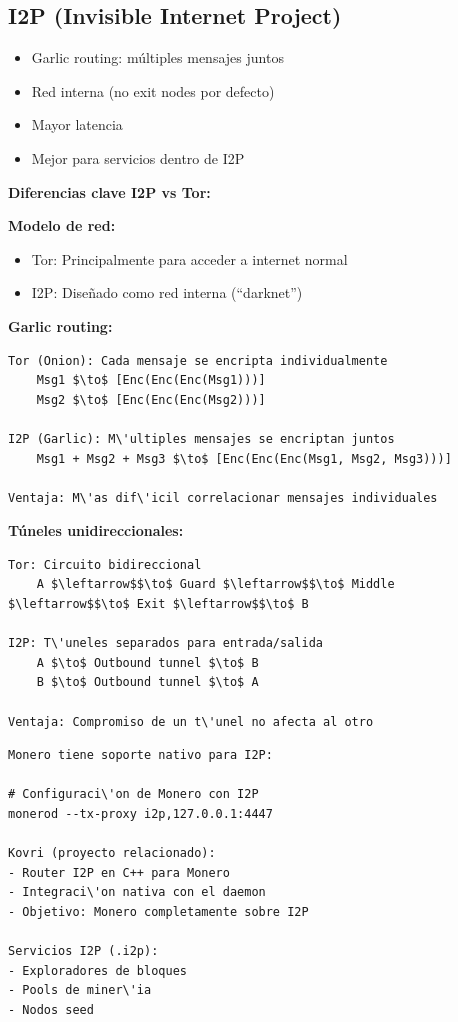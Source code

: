 \documentclass[11pt,a4paper,twoside]{book}
\begin{document}
\subsection{I2P (Invisible Internet Project)}

\begin{itemize}
    \item Garlic routing: m\'ultiples mensajes juntos
    \item Red interna (no exit nodes por defecto)
    \item Mayor latencia
    \item Mejor para servicios dentro de I2P
\end{itemize}

\begin{mathnote}
\textbf{Diferencias clave I2P vs Tor:}

\textbf{Modelo de red:}
\begin{itemize}
    \item Tor: Principalmente para acceder a internet normal
    \item I2P: Dise\~nado como red interna (``darknet'')
\end{itemize}

\textbf{Garlic routing:}
\begin{verbatim}
Tor (Onion): Cada mensaje se encripta individualmente
    Msg1 $\to$ [Enc(Enc(Enc(Msg1)))]
    Msg2 $\to$ [Enc(Enc(Enc(Msg2)))]

I2P (Garlic): M\'ultiples mensajes se encriptan juntos
    Msg1 + Msg2 + Msg3 $\to$ [Enc(Enc(Enc(Msg1, Msg2, Msg3)))]
    
Ventaja: M\'as dif\'icil correlacionar mensajes individuales
\end{verbatim}

\textbf{T\'uneles unidireccionales:}
\begin{verbatim}
Tor: Circuito bidireccional
    A $\leftarrow$$\to$ Guard $\leftarrow$$\to$ Middle $\leftarrow$$\to$ Exit $\leftarrow$$\to$ B

I2P: T\'uneles separados para entrada/salida
    A $\to$ Outbound tunnel $\to$ B
    B $\to$ Outbound tunnel $\to$ A
    
Ventaja: Compromiso de un t\'unel no afecta al otro
\end{verbatim}
\end{mathnote}

\begin{example}[I2P en crypto]
\begin{verbatim}
Monero tiene soporte nativo para I2P:

# Configuraci\'on de Monero con I2P
monerod --tx-proxy i2p,127.0.0.1:4447

Kovri (proyecto relacionado):
- Router I2P en C++ para Monero
- Integraci\'on nativa con el daemon
- Objetivo: Monero completamente sobre I2P

Servicios I2P (.i2p):
- Exploradores de bloques
- Pools de miner\'ia
- Nodos seed
\end{verbatim}
\end{example}
\end{document}
